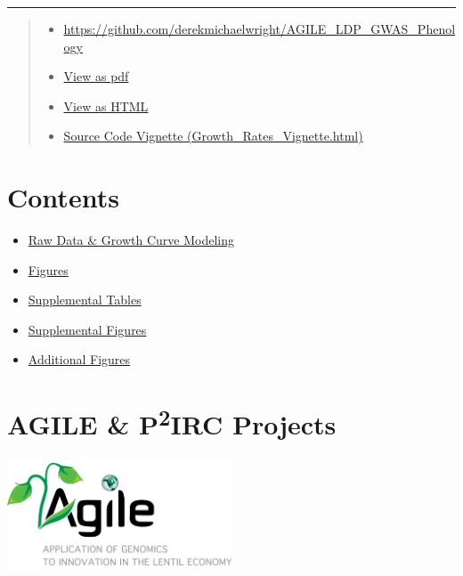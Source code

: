 \documentclass[
]{article}
\providecommand{\tightlist}{%
  \setlength{\itemsep}{0pt}\setlength{\parskip}{0pt}}
\begin{document}
\begin{center}\rule{0.5\linewidth}{0.5pt}\end{center}

\begin{quote}
\begin{itemize}
\tightlist
\item
  \url{https://github.com/derekmichaelwright/AGILE_LDP_GWAS_Phenology}
\item
  \href{https://github.com/derekmichaelwright/AGILE_LDP_UAV/raw/master/README.pdf}{View
  as pdf}
\item
  \href{https://derekmichaelwright.github.io/AGILE_LDP_UAV/README.html}{View
  as HTML}
\item
  \href{https://derekmichaelwright.github.io/AGILE_LDP_UAV/Growth_Rates_Vignette.html}{Source
  Code Vignette (Growth\_Rates\_Vignette.html)}
\end{itemize}
\end{quote}

\section{Contents}\label{contents}

\begin{itemize}
\tightlist
\item
  \hyperref[raw-data-ux26-growth-curve-modeling]{Raw Data \& Growth
  Curve Modeling}
\item
  \hyperref[figures]{Figures}
\item
  \hyperref[supplemental-tables]{Supplemental Tables}
\item
  \hyperref[supplemental-figures]{Supplemental Figures}
\item
  \hyperref[additional-figures]{Additional Figures}
\end{itemize}

\section{\texorpdfstring{AGILE \& P\textsuperscript{2}IRC
Projects}{AGILE \& P2IRC Projects}}\label{agile-p2irc-projects}

\includegraphics[width=0.5\textwidth,height=\textheight]{Additional/img_Agile.png}
\end{document}
